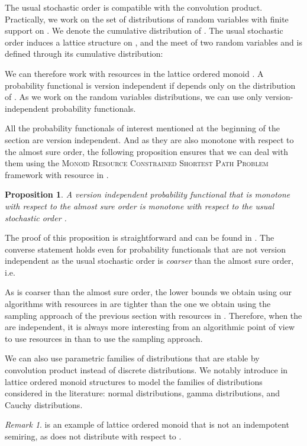\documentclass[11pt]{amsart}
\theoremstyle{plain}
\newtheorem{prop}[theo]{Proposition}
\theoremstyle{remark}
\newtheorem{rem}{Remark}
\newcommand{\MRCSP}{\textsc{Monoid Resource Constrained Shortest Path Problem}\xspace}
\begin{document}
The usual stochastic order is compatible with the convolution product. Practically, we work on the set  of distributions of random variables with finite support on . We denote  the cumulative distribution of . The usual stochastic order induces a lattice structure on , and the meet  of two random variables  and  is defined through its cumulative distribution:

We can therefore work with resources in the lattice ordered monoid . A probability functional  is version independent if  depends only on the distribution of . As we work on the random variables distributions, we can use only version-independent probability functionals. 

All the probability functionals of interest mentioned at the beginning of the section are version independent. And as they are also monotone with respect to the almost sure order, the following proposition ensures that we can deal with them using the \MRCSP framework with resource in .

\begin{prop}\label{prop:MonotonicityLeqSt}
A version independent probability functional that is monotone with respect to the almost sure order is monotone with respect to the usual stochastic order .
\end{prop}
The proof of this proposition is straightforward and can be found in \cite{parmentier2016thesis}. The converse statement holds even for probability functionals that are not version independent as the usual stochastic order is \emph{coarser} than the almost sure order, i.e.


As  is coarser than the almost sure order, the lower bounds we obtain using our algorithms with resources in  are tighter than the one we obtain using the sampling approach of the previous section with resources in . Therefore, when the  are independent, it is always more interesting from an algorithmic point of view to use resources in  than to use the sampling approach.

We can also use parametric families of distributions that are stable by convolution product instead of discrete distributions. We notably introduce in \cite{parmentier2016thesis} lattice ordered monoid structures to model the families of distributions considered in the literature: normal distributions, gamma distributions, and Cauchy distributions.

\begin{rem}
 is an example of lattice ordered monoid that is not an indempotent semiring, as  does not distribute with respect to .
\end{rem}
\end{document}
